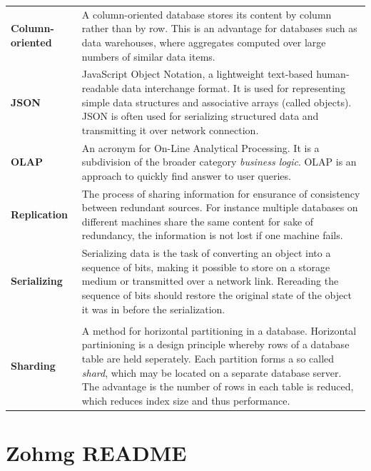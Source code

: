 \begin{tabular}[t]{lp{100mm}}
\textbf{Column-oriented} &
A column-oriented database stores its content by column rather than by row.
This is an advantage for databases such as data warehouses, where aggregates
computed over large numbers of similar data items.

 \\

\textbf{JSON} &
JavaScript Object Notation, a lightweight text-based human-readable data
interchange format. It is used for representing simple data structures and
associative arrays (called objects). JSON is often used for serializing
structured data and transmitting it over network connection.

 \\

\textbf{OLAP} &
An acronym for On-Line Analytical Processing. It is a subdivision of the broader
category \textit{business logic}. OLAP is an approach to quickly find answer to
user queries.

 \\

\textbf{Replication} &
The process of sharing information for ensurance of consistency between
redundant sources. For instance multiple databases on different machines share
the same content for sake of redundancy, the information is not lost if one
machine fails.

 \\

\textbf{Serializing} &
Serializing data is the task of converting an object into a sequence of bits,
making it possible to store on a storage medium or transmitted over a network
link. Rereading the sequence of bits should restore the original state of the
object it was in before the serialization. \\

 \\

\textbf{Sharding} &
A method for horizontal partitioning in a database. Horizontal partinioning is a
design principle whereby rows of a database table are held seperately. Each
partition forms a so called \textit{shard}, which may be located on a separate
database server. The advantage is the number of rows in each table is reduced,
which reduces index size and thus performance.
\end{tabular}


\chapter{Zohmg README}

